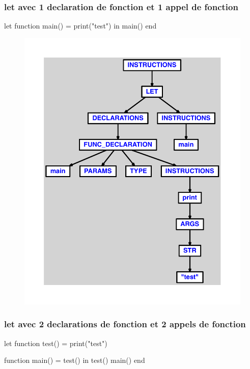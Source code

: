 \documentclass{article}
\begin{document}
\subsubsection{let avec 1 declaration de fonction et 1 appel de fonction}
\begin{verbatimtab}
let
	function main() = print("test")
in main() end
\end{verbatimtab}
\begin{figure}[H]\centering\includegraphics[max width=\textwidth]{ast/ast_263.pdf}\end{figure}\subsubsection{let avec 2 declarations de fonction et 2 appels de fonction}
\begin{verbatimtab}
let
	function test() = print("test")

	function main() = test()
in
	test()
	main()
end
\end{verbatimtab}
\end{document}
